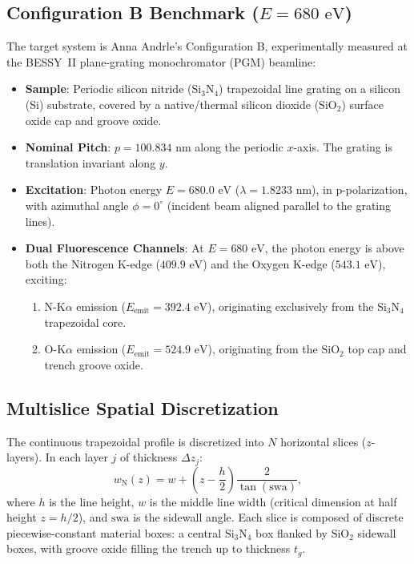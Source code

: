 \documentclass[11pt,a4paper]{article}
\begin{document}
\subsection{Configuration B Benchmark ($E = 680\text{ eV}$)}
The target system is Anna Andrle's Configuration B, experimentally measured at the BESSY~II plane-grating monochromator (PGM) beamline:
\begin{itemize}
    \item \textbf{Sample}: Periodic silicon nitride ($\mathrm{Si}_3\mathrm{N}_4$) trapezoidal line grating on a silicon (Si) substrate, covered by a native/thermal silicon dioxide ($\mathrm{SiO}_2$) surface oxide cap and groove oxide.
    \item \textbf{Nominal Pitch}: $p = 100.834\text{ nm}$ along the periodic $x$-axis. The grating is translation invariant along $y$.
    \item \textbf{Excitation}: Photon energy $E = 680.0\text{ eV}$ ($\lambda = 1.8233\text{ nm}$), in p-polarization, with azimuthal angle $\phi = 0^\circ$ (incident beam aligned parallel to the grating lines).
    \item \textbf{Dual Fluorescence Channels}: At $E = 680\text{ eV}$, the photon energy is above both the Nitrogen K-edge ($409.9\text{ eV}$) and the Oxygen K-edge ($543.1\text{ eV}$), exciting:
    \begin{enumerate}
        \item $\mathrm{N}$-$\mathrm{K}\alpha$ emission ($E_{\mathrm{emit}} = 392.4\text{ eV}$), originating exclusively from the $\mathrm{Si}_3\mathrm{N}_4$ trapezoidal core.
        \item $\mathrm{O}$-$\mathrm{K}\alpha$ emission ($E_{\mathrm{emit}} = 524.9\text{ eV}$), originating from the $\mathrm{SiO}_2$ top cap and trench groove oxide.
    \end{enumerate}
\end{itemize}

\subsection{Multislice Spatial Discretization}
The continuous trapezoidal profile is discretized into $N$ horizontal slices ($z$-layers). In each layer $j$ of thickness $\Delta z_j$:
\begin{equation}
    w_{\mathrm{N}}(z) = w + \left(z - \frac{h}{2}\right) \frac{2}{\tan(\mathrm{swa})},
\end{equation}
where $h$ is the line height, $w$ is the middle line width (critical dimension at half height $z = h/2$), and $\mathrm{swa}$ is the sidewall angle. Each slice is composed of discrete piecewise-constant material boxes: a central $\mathrm{Si}_3\mathrm{N}_4$ box flanked by $\mathrm{SiO}_2$ sidewall boxes, with groove oxide filling the trench up to thickness $t_g$.
\end{document}
